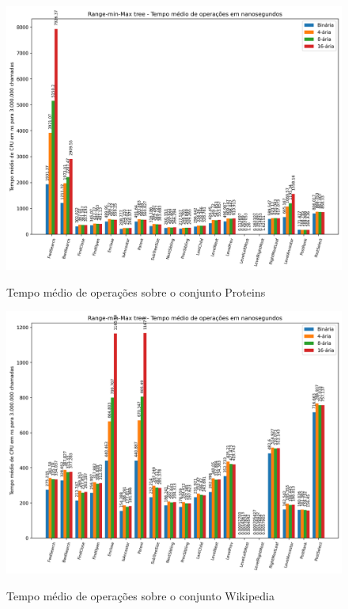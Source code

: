 \begin{figure}[!ht]
    \centering
      \caption[Operações sobre o conjunto de dado proteins]{Tempo médio de operações sobre o conjunto Proteins}{
          \includegraphics[scale=0.8, angle=90]{images/prot_i3000000.png}
        }
\end{figure}

\begin{figure}[!ht]
    \centering
      \caption[Operações sobre o conjunto de dado wikipedia]{Tempo médio de operações sobre o conjunto Wikipedia}{
          \includegraphics[scale=0.8, angle=90]{images/wiki_i3000000.png}
        }
\end{figure}
